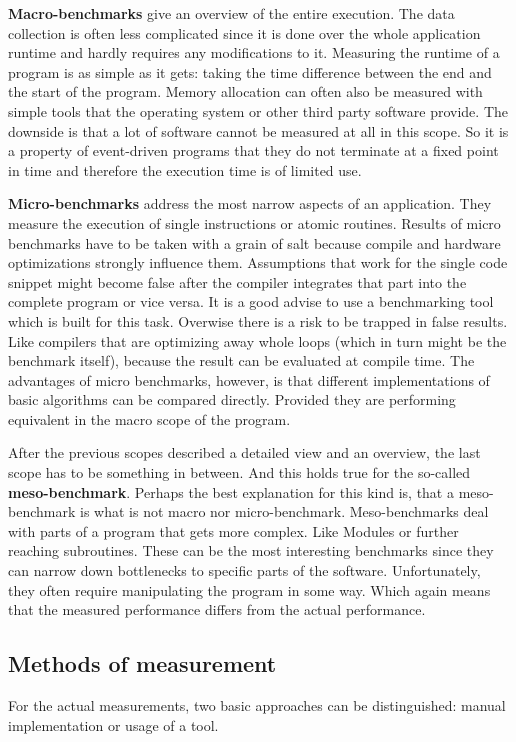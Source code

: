 \textbf{Macro-benchmarks} give an overview of the entire execution. The data collection is often less complicated since it is done over the whole application runtime and hardly requires any modifications to it. Measuring the runtime of a program is as simple as it gets: taking the time difference between the end and the start of the program. Memory allocation can often also be measured with simple tools that the operating system or other third party software provide. The downside is that a lot of software cannot be measured at all in this scope. So it is a property of event-driven programs that they do not terminate at a fixed point in time and therefore the execution time is of limited use.

\textbf{Micro-benchmarks} address the most narrow aspects of an application. They measure the execution of single instructions or atomic routines. Results of micro benchmarks have to be taken with a grain of salt because compile and hardware optimizations strongly influence them. Assumptions that work for the single code snippet might become false after the compiler integrates that part into the complete program or vice versa. It is a good advise to use a benchmarking tool which is built for this task. Overwise there is a risk to be trapped in false results. Like compilers that are optimizing away whole loops (which in turn might be the benchmark itself), because the result can be evaluated at compile time. The advantages of micro benchmarks, however, is that different implementations of basic algorithms can be compared directly. Provided they are performing equivalent in the macro scope of the program.

After the previous scopes described a detailed view and an overview, the last scope has to be something in between. And this holds true for the so-called \textbf{meso-benchmark}. Perhaps the best explanation for this kind is, that a meso-benchmark is what is not macro nor micro-benchmark. Meso-benchmarks deal with parts of a program that gets more complex. Like Modules or further reaching subroutines. These can be the most interesting benchmarks since they can narrow down bottlenecks to specific parts of the software. Unfortunately, they often require manipulating the program in some way. Which again means that the measured performance differs from the actual performance.


\subsection{Methods of measurement}
\label{BenchMethods}
For the actual measurements, two basic approaches can be distinguished: manual implementation or usage of a tool.

